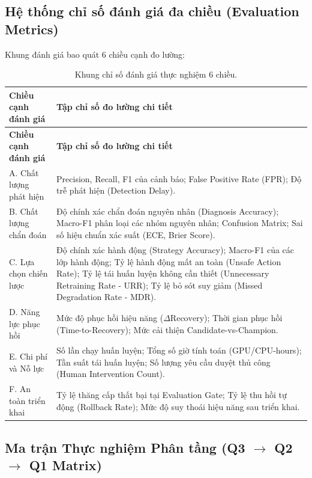 \subsection{Hệ thống chỉ số đánh giá đa chiều (Evaluation Metrics)}

Khung đánh giá bao quát 6 chiều cạnh đo lường:

\begin{xltabular}{\linewidth}{@{}L{3.5cm} Y@{}}
\caption{Khung chỉ số đánh giá thực nghiệm 6 chiều.}\label{tab:metrics}\\
\toprule
\textbf{Chiều cạnh đánh giá} & \textbf{Tập chỉ số đo lường chi tiết} \\
\midrule
\endfirsthead
\toprule
\textbf{Chiều cạnh đánh giá} & \textbf{Tập chỉ số đo lường chi tiết} \\
\midrule
\endhead

A. Chất lượng phát hiện & Precision, Recall, F1 của cảnh báo; False Positive Rate (FPR); Độ trễ phát hiện (Detection Delay). \\
\addlinespace

B. Chất lượng chẩn đoán & Độ chính xác chẩn đoán nguyên nhân (Diagnosis Accuracy); Macro-F1 phân loại các nhóm nguyên nhân; Confusion Matrix; Sai số hiệu chuẩn xác suất (ECE, Brier Score). \\
\addlinespace

C. Lựa chọn chiến lược & Độ chính xác hành động (Strategy Accuracy); Macro-F1 của các lớp hành động; Tỷ lệ hành động mất an toàn (Unsafe Action Rate); Tỷ lệ tái huấn luyện không cần thiết (Unnecessary Retraining Rate - URR); Tỷ lệ bỏ sót suy giảm (Missed Degradation Rate - MDR). \\
\addlinespace

D. Năng lực phục hồi & Mức độ phục hồi hiệu năng ($\Delta \text{Recovery}$); Thời gian phục hồi (Time-to-Recovery); Mức cải thiện Candidate-vs-Champion. \\
\addlinespace

E. Chi phí và Nỗ lực & Số lần chạy huấn luyện; Tổng số giờ tính toán (GPU/CPU-hours); Tần suất tái huấn luyện; Số lượng yêu cầu duyệt thủ công (Human Intervention Count). \\
\addlinespace

F. An toàn triển khai & Tỷ lệ thăng cấp thất bại tại Evaluation Gate; Tỷ lệ thu hồi tự động (Rollback Rate); Mức độ suy thoái hiệu năng sau triển khai. \\
\bottomrule
\end{xltabular}

\subsection{Ma trận Thực nghiệm Phân tầng \texorpdfstring{(Q3 $\rightarrow$ Q2 $\rightarrow$ Q1 Matrix)}{(Q3 -> Q2 -> Q1 Matrix)}}

